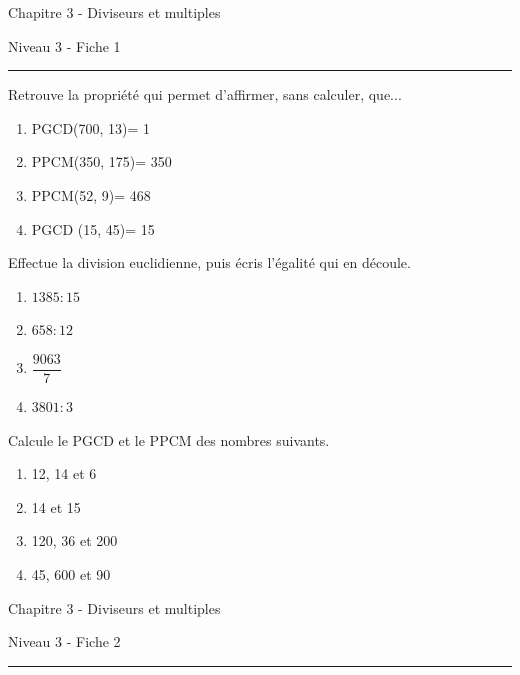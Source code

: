 \documentclass[12pt,parskip=half-, twoside=semi]{scrartcl}
\begin{document}
\begin{center}
  \bfseries
  \begin{Huge}
    Chapitre 3 - Diviseurs et multiples
  \end{Huge}
  \smallbreak
  \begin{large}
    Niveau 3    - Fiche 1
  \end{large}
  \smallbreak
  \rule[10pt]{.5\linewidth}{1 pt}
\end{center}

\setcounter{exercise}{0}
      
\begin{exercise}
  Retrouve la propriété qui permet d'affirmer, sans calculer, que... 
  \begin{enumerate}[cols=2]
    \item PGCD(700, 13)= 1
    \item PPCM(350, 175)= 350
    \item PPCM(52, 9)= 468
    \item PGCD (15, 45)= 15
  \end{enumerate}
\end{exercise}

\begin{exercise}
  Effectue la division euclidienne, puis écris l'égalité qui en découle. 
    \begin{enumerate}[cols=2]
      \item \(1385 : 15\)
      \item \(658 : 12\)
      \item \(\dfrac{9063}{7}\)
      \item \(3801 : 3\)
    \end{enumerate}
\end{exercise}

\begin{exercise}
  Calcule le PGCD et le PPCM des nombres suivants. 
    \begin{enumerate}[cols=2]
      \item 12, 14 et 6
      \item 14 et 15
      \item 120, 36 et 200
      \item 45, 600 et 90
    \end{enumerate}
\end{exercise}

\newpage

\begin{center}
  \bfseries
  \begin{Huge}
    Chapitre 3 - Diviseurs et multiples
  \end{Huge}
  \smallbreak
  \begin{large}
    Niveau 3    - Fiche 2
  \end{large}
  \smallbreak
  \rule[10pt]{.5\linewidth}{1 pt}
\end{center}
\end{document}
